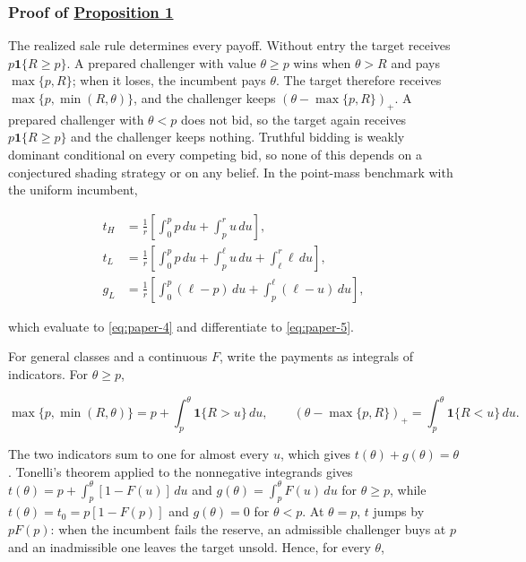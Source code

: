 \subsubsection{\texorpdfstring{Proof of
\hyperref[result-proposition-1]{Proposition
1}}{Proof of Proposition 1}}\label{proof-of-proposition-1}

The realized sale rule determines every payoff. Without entry the target
receives \(p\mathbf1\{R\ge p\}\). A prepared challenger with value
\(\theta\ge p\) wins when \(\theta>R\) and pays \(\max\{p,R\}\); when it
loses, the incumbent pays \(\theta\). The target therefore receives
\(\max\{p,\min(R,\theta)\}\), and the challenger keeps
\((\theta-\max\{p,R\})_+\). A prepared challenger with \(\theta<p\) does
not bid, so the target again receives \(p\mathbf1\{R\ge p\}\) and the
challenger keeps nothing. Truthful bidding is weakly dominant
conditional on every competing bid, so none of this depends on a
conjectured shading strategy or on any belief. In the point-mass
benchmark with the uniform incumbent,

\[
\begin{aligned}
t_H&=\frac1r\left[\int_0^p p\,du+\int_p^r u\,du\right],\\
t_L&=\frac1r\left[\int_0^p p\,du+\int_p^\ell u\,du+\int_\ell^r\ell\,du\right],\\
g_L&=\frac1r\left[\int_0^p(\ell-p)\,du+\int_p^\ell(\ell-u)\,du\right],
\end{aligned}
\tag{A.1}\label{eq:paper-a-1}
\]

which evaluate to \eqref{eq:paper-4} and differentiate to
\eqref{eq:paper-5}.

For general classes and a continuous \(F\), write the payments as
integrals of indicators. For \(\theta\ge p\),

\[
\max\{p,\min(R,\theta)\}=p+\int_p^\theta\mathbf1\{R>u\}\,du,
\qquad
(\theta-\max\{p,R\})_+=\int_p^\theta\mathbf1\{R<u\}\,du.
\tag{A.2}\label{eq:paper-a-2}
\]

The two indicators sum to one for almost every \(u\), which gives
\(t(\theta)+g(\theta)=\theta\). Tonelli's theorem applied to the
nonnegative integrands gives
\(t(\theta)=p+\int_p^\theta[1-F(u)]\,du\) and
\(g(\theta)=\int_p^\theta F(u)\,du\) for \(\theta\ge p\), while
\(t(\theta)=t_0=p[1-F(p)]\) and \(g(\theta)=0\) for \(\theta<p\). At
\(\theta=p\), \(t\) jumps by \(pF(p)\): when the incumbent fails the
reserve, an admissible challenger buys at \(p\) and an inadmissible one
leaves the target unsold. Hence, for every \(\theta\),

